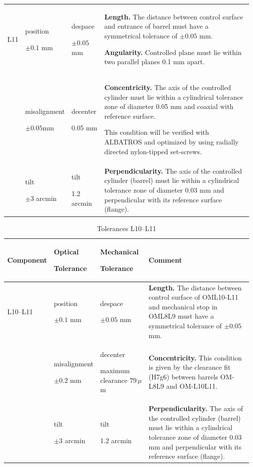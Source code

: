\documentclass{report}
\begin{document}
\begin{table}
\begin{center}
\begin{tabular}{lp{2cm}p{2cm}p{7cm}}
\hline
L11
&position\par $\pm 0.1$ mm& despace\par $\pm 0.05$ mm & \textbf{Length.} The distance between control surface and entrance of barrel must have a symmetrical tolerance of $\pm 0.05$ mm.\par
\textbf{Angularity.} Controlled plane must lie within two parallel planes 0.1 mm apart.\\
&misalignment\par $\pm 0.05$mm & decenter\par 0.05 mm & \textbf{Concentricity.} The axis of the controlled cylinder must lie within a cylindrical tolerance zone of diameter 0.05 mm and coaxial with reference surface.\par
This condition will be verified with ALBATROS and optimized by using radially directed nylon-tipped set-screws. \\
& tilt\par $\pm 3$ arcmin & tilt\par 1.2 arcmin & \textbf{Perpendicularity.} The axis of the controlled cylinder (barrel) must lie within a cylindrical tolerance zone of diameter 0.03 mm and perpendicular with its reference surface (flange).\\
\hline
\end{tabular}
\end{center}
\end{table}

\begin{table}
\caption{Tolerances L10--L11}
\label{table:tol_L10L11}
\begin{center}
\small
\begin{tabular}{lp{2cm}p{2cm}p{7cm}}
\hline
\hline
Component&Optical\par Tolerance&Mechanical\par Tolerance&Comment\\
\hline
L10--L11
& position\par $\pm 0.1$ mm & despace\par $\pm 0.05$ mm & \textbf{Length.} The distance between control surface of OML10-L11 and mechanical stop in OML8L9 must have a symmetrical tolerance of $\pm 0.05$ mm.\\
&misalignment \par $\pm 0.2$ mm & decenter\par maximum clearance $79 \,\mu$m & \textbf{Concentricity.} This condition is given by the clearance fit (H7g6) between barrels OM-L8L9 and OM-L10L11.\\
&tilt \par $\pm 3$ arcmin & tilt\par 1.2 arcmin & \textbf{Perpendicularity.} The axis of the controlled cylinder (barrel) must lie within a cylindrical tolerance zone of diameter 0.03 mm and perpendicular with its reference surface (flange).\\
\hline
\end{tabular}
\end{center}
\end{table}
\end{document}
